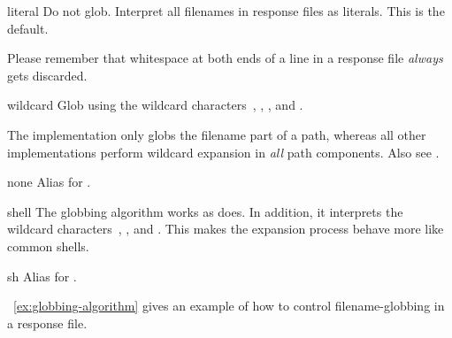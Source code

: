 \begin{table}[htbp]
  \begin{minipage}{\linewidth}
    \begin{codelist}
    \item[literal]\itemend
      Do not glob.  Interpret all filenames in response files as literals. This is the default.

      Please remember that whitespace at both ends of a line in a response file \emph{always}
      gets discarded.

    \item[wildcard]\itemend
      Glob using the wildcard characters~, \sample{*}, \sample{[}, and \sample{]}.

      The  implementation only globs the filename part of a path, whereas all
      other implementations perform wildcard expansion in \emph{all} path components.  Also see
      .

    \item[none]\itemend
      Alias for .

    \item[shell]\itemend
      The  globbing algorithm works as  does.  In addition, it
      interprets the wildcard characters~\sample{\{}, \sample{\atsign}, and \sample{\squiggle}.
      This makes the expansion process behave more like common 
      shells.

    \item[sh]\itemend
      Alias for .
    \end{codelist}
  \end{minipage}

  \caption[Globbing algorithms]{\label{tab:globbing-algorithms}%
    Globbing algorithms for the use in response files.}
\end{table}

\exampleName~\ref{ex:globbing-algorithm} gives an example of how to control filename-globbing in
a response file.

